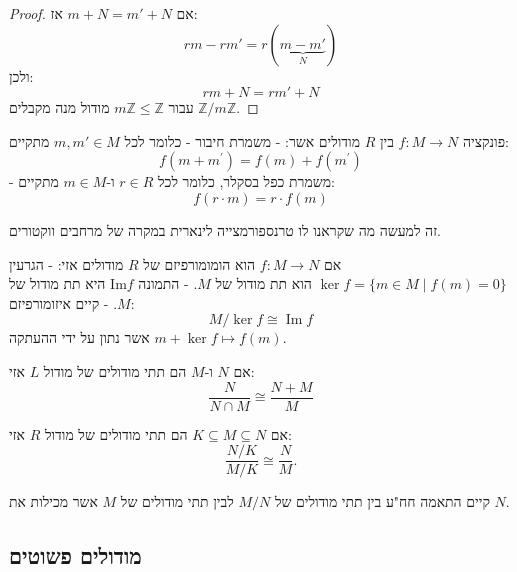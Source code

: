 \documentclass{tstextbook}
\begin{document}
\begin{proof}
אם \(m+N=m'+N\) אז:
$$r m - r m' = r(\underbrace{ m - m' }_{ N })$$
ולכן:
$$r m +N= r m' +N$$
עבור \(m\mathbb{Z}\leq \mathbb{Z}\) מודול מנה מקבלים \(\mathbb{Z} / m\mathbb{Z}\).

\end{proof}
\begin{definition}
פונקציה \(f:M\to N\) בין \(R\) מודולים אשר:
- משמרת חיבור - כלומר לכל \(m,m' \in M\) מתקיים:
$$f(m+m^{\prime})=f(m)+f(m^{\prime})$$
- משמרת כפל בסקלר, כלומר לכל \(r \in R\) ו-\(m \in M\) מתקיים:
$$f(r\cdot m)=r\cdot f(m)$$

\end{definition}
\begin{remark}
זה למעשה מה שקראנו לו טרנספורמצייה לינארית במקרה של מרחבים ווקטורים.

\end{remark}
\begin{proposition}
אם \(f:M\to N\) הוא הומומורפיזם של \(R\) מודולים אזי:
- הגרעין \(\ker f = \{ m \in M\mid f(m)=0 \}\) הוא תת מודול של \(M\).
- התמונה \(\mathrm{Im}f\) היא תת מודול של \(M\).
- קיים איזומורפיזם:
$$M/\ker f\cong\operatorname{Im}f$$
אשר נתון על ידי ההעתקה \(m+\ker f\mapsto f(m)\).

\end{proposition}
\begin{proposition}
אם \(N\) ו-\(M\) הם תתי מודולים של מודול \(L\) אזי:
$$\frac{N}{N\cap M}\cong\frac{N+M}{M}$$

\end{proposition}
\begin{proposition}
אם \(K\subseteq M \subseteq N\) הם תתי מודולים של מודול \(R\) אזי:
$${\frac{N/K}{M/K}}\cong{\frac{N}{M}}.$$

\end{proposition}
\begin{proposition}
קיים התאמה חח"ע בין תתי מודולים של \(M / N\) לבין תתי מודולים של \(M\) אשר מכילות את \(N\).

\end{proposition}
\subsection{מודולים פשוטים}
\end{document}
